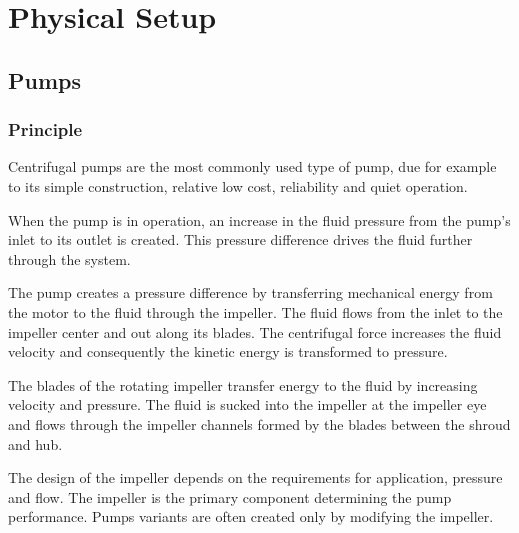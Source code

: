 \chapter{Physical Setup}\label{ch:physsetup}
\section{Pumps}
\subsection{Principle}
Centrifugal pumps are the most commonly used type of pump,
due for example to its simple construction, relative low 
cost, reliability and quiet operation.

When the pump is in operation,
an increase in the fluid pressure from the pump's inlet to its outlet is created.
This pressure difference drives the fluid further through the system.

The pump creates a pressure difference by transferring mechanical energy from the motor to the fluid through the impeller. 
The fluid flows from the inlet to the impeller center and out along its blades.
The centrifugal force increases the fluid velocity and consequently the kinetic energy is transformed to pressure. 

The blades of the rotating impeller transfer energy to the fluid by increasing velocity and pressure.
The fluid is sucked into the impeller at the impeller eye and flows through the impeller channels formed by the blades between the shroud and hub.

The design of the impeller depends on the requirements for application, pressure and flow. The impeller is the primary component 
determining the pump performance. Pumps variants are often created only by modifying the impeller.

